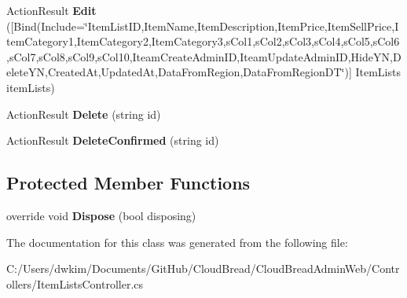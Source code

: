 \begin{DoxyCompactItemize}
\item 
Action\+Result {\bfseries Edit} (\mbox{[}Bind(Include=\char`\"{}Item\+List\+ID,Item\+Name,Item\+Description,Item\+Price,Item\+Sell\+Price,Item\+Category1,Item\+Category2,Item\+Category3,s\+Col1,s\+Col2,s\+Col3,s\+Col4,s\+Col5,s\+Col6,s\+Col7,s\+Col8,s\+Col9,s\+Col10,Iteam\+Create\+Admin\+ID,Iteam\+Update\+Admin\+ID,Hide\+YN,Delete\+YN,Created\+At,Updated\+At,Data\+From\+Region,Data\+From\+Region\+DT\char`\"{})\mbox{]} Item\+Lists item\+Lists)\hypertarget{a00128_ae80de28ebc8e764bcb0ab2d4a9d16c34}{}\label{a00128_ae80de28ebc8e764bcb0ab2d4a9d16c34}

\item 
Action\+Result {\bfseries Delete} (string id)\hypertarget{a00128_ab61271c6f7ecb200b4eb86c5938192f0}{}\label{a00128_ab61271c6f7ecb200b4eb86c5938192f0}

\item 
Action\+Result {\bfseries Delete\+Confirmed} (string id)\hypertarget{a00128_af176c633ced4148fdc22cbc67db9bd76}{}\label{a00128_af176c633ced4148fdc22cbc67db9bd76}

\end{DoxyCompactItemize}
\subsection*{Protected Member Functions}
\begin{DoxyCompactItemize}
\item 
override void {\bfseries Dispose} (bool disposing)\hypertarget{a00128_a3b733cdefccc9047fd17210711465992}{}\label{a00128_a3b733cdefccc9047fd17210711465992}

\end{DoxyCompactItemize}


The documentation for this class was generated from the following file\+:\begin{DoxyCompactItemize}
\item 
C\+:/\+Users/dwkim/\+Documents/\+Git\+Hub/\+Cloud\+Bread/\+Cloud\+Bread\+Admin\+Web/\+Controllers/Item\+Lists\+Controller.\+cs\end{DoxyCompactItemize}
